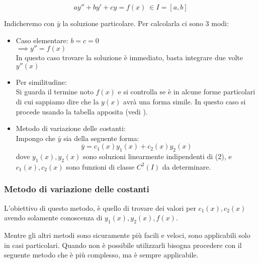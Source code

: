 \[
    ay''+by'+cy = f(x)\ \in I=[a,b]
\]

Indicheremo con \(\bar{y}\) la soluzione particolare. Per calcolarla ci sono 3 modi:

\begin{itemize}
    \item Caso elementare: \(b =c = 0\) \\
          \(\implies y'' = f(x)\) \\
          In questo caso trovare la soluzione è immediato, basta integrare due volte \(y''(x)\)
    \item Per similitudine: \\
          Si guarda il termine noto \(f(x)\) e si controlla se è in alcune forme particolari di cui sappiamo dire che la \(y(x)\) avrà una forma simile.
          In questo caso si procede usando la tabella apposita (vedi \underline{}).
    \item Metodo di variazione delle costanti: \\
          Impongo che \(\bar{y}\) sia della seguente forma:
          \[
              \bar{y} = c_1(x) y_1(x) + c_2(x) y_2(x)
          \]
          dove \({y_1(x),y_2(x)}\) sono soluzioni linearmente indipendenti di (2), e \(c_1(x),c_2(x)\) sono funzioni di classe \(C^{2}(I)\) da determinare.
\end{itemize}

\subsubsection*{Metodo di variazione delle costanti}

L'obiettivo di questo metodo, è quello di trovare dei valori per \(c_1(x), c_2(x)\) avendo solamente conoscenza di \(y_1(x), y_2(x), f(x)\).

Mentre gli altri metodi sono sicuramente più facili e veloci, sono applicabili solo in casi particolari. Quando non è possibile utilizzarli bisogna procedere con il seguente metodo che è più complesso, ma è sempre applicabile.

